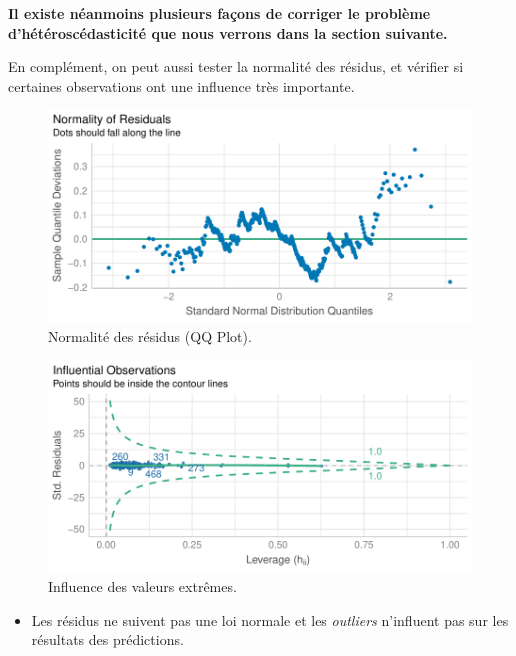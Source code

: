 \documentclass[
  12pt,
]{report}
\providecommand{\tightlist}{%
  \setlength{\itemsep}{0pt}\setlength{\parskip}{0pt}}\usepackage{longtable,booktabs,array}
\begin{document}
\textbf{Il existe néanmoins plusieurs façons de corriger le problème
d'hétéroscédasticité que nous verrons dans la section suivante.}

En complément, on peut aussi tester la normalité des résidus, et
vérifier si certaines observations ont une influence très importante.

\begin{figure}[H]

{\centering \includegraphics{report_files/figure-pdf/normality-1.pdf}

}

\caption{Normalité des résidus (QQ Plot).}

\end{figure}%

\begin{figure}[H]

{\centering \includegraphics{report_files/figure-pdf/outliers-1.pdf}

}

\caption{Influence des valeurs extrêmes.}

\end{figure}%

\begin{itemize}
\tightlist
\item
  Les résidus ne suivent pas une loi normale et les \emph{outliers}
  n'influent pas sur les résultats des prédictions.
\end{itemize}
\end{document}
